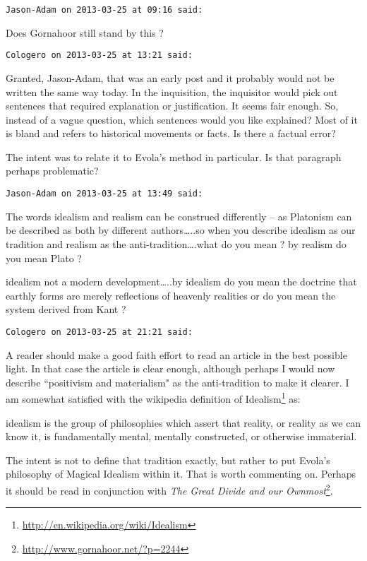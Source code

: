 \begin{footnotesize}\begin{sffamily}



\texttt{Jason-Adam on 2013-03-25 at 09:16 said: }

Does Gornahoor still stand by this ?


\hfill

\texttt{Cologero on 2013-03-25 at 13:21 said: }

Granted, Jason-Adam, that was an early post and it probably would not be written the same way today. In the inquisition, the inquisitor would pick out sentences that required explanation or justification. It seems fair enough. So, instead of a vague question, which sentences would you like explained? Most of it is bland and refers to historical movements or facts. Is there a factual error?

The intent was to relate it to Evola's method in particular. Is that paragraph perhaps problematic?


\hfill

\texttt{Jason-Adam on 2013-03-25 at 13:49 said: }

The words idealism and realism can be construed differently – as Platonism can be described as both by different authors…..so when you describe idealism as our tradition and realism as the anti-tradition….what do you mean ? by realism do you mean Plato ?

idealism not a modern development…..by idealism do you mean the doctrine that earthly forms are merely reflections of heavenly realities or do you mean the system derived from Kant ?


\hfill

\texttt{Cologero on 2013-03-25 at 21:21 said: }

A reader should make a good faith effort to read an article in the best possible light. In that case the article is clear enough, although perhaps I would now describe ``positivism and materialism" as the anti-tradition to make it clearer. I am somewhat satisfied with the wikipedia definition of Idealism\footnote{\url{http://en.wikipedia.org/wiki/Idealism}} as:

\begin{quotex}
idealism is the group of philosophies which assert that reality, or reality as we can know it, is fundamentally mental, mentally constructed, or otherwise immaterial. 

\end{quotex}
The intent is not to define that tradition exactly, but rather to put Evola's philosophy of Magical Idealism within it. That is worth commenting on. Perhaps it should be read in conjunction with \textit{The Great Divide and our Ownmost}\footnote{\url{http://www.gornahoor.net/?p=2244}}.



\end{sffamily}
\end{footnotesize}
